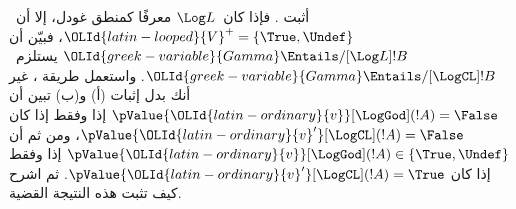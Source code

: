 \documentclass[../../../include/open-logic-section]{subfiles}
\begin{document}
\begin{prob}
  أثبت . فإذا كان~$\Log L$
  معرفًا كمنطق غودل، إلا أن~${\OLId{latin-looped}{V}}^+=\{\True,\Undef\}$، فبيّن أن
  ${\OLId{greek-variable}{Gamma}} \Entails/[\Log L] !B$ يستلزم~${\OLId{greek-variable}{Gamma}} \Entails/[\LogCL] !B$.
  واستعمل طريقة ، غير أنك بدل
  إثبات (أ) و(ب) تبين أن
  $\pValue {\OLId{latin-ordinary}{v}}[\LogGod](!A) = \False$ إذا وفقط إذا كان
  $\pValue {{\OLId{latin-ordinary}{v}}'}[\LogCL](!A) = \False$، ومن ثم أن
  $\pValue {\OLId{latin-ordinary}{v}}[\LogGod](!A) \in \{\True,\Undef\}$ إذا وفقط إذا كان
  $\pValue {{\OLId{latin-ordinary}{v}}'}[\LogCL](!A) = \True$. ثم اشرح كيف تثبت هذه النتيجة
  القضية.
\end{prob}
\end{document}

